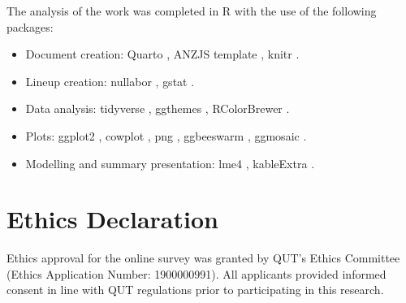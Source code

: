 \documentclass[
doublespace,
  times]{anzsauth}
\providecommand{\tightlist}{%
  \setlength{\itemsep}{0pt}\setlength{\parskip}{0pt}}
\begin{document}
The analysis of the work was completed in \textsf{R} \citep{RCore} with
the use of the following packages:

\begin{itemize}
\tightlist
\item
  Document creation: \textsf{Quarto} \citep{Allaire_Quarto_2025}, ANZJS
  template \citep{quarto-anzjs}, \textsf{knitr} \citep{knitr}.
\item
  Lineup creation: \textsf{nullabor} \citep{nullabor}, \textsf{gstat}
  \citep{gstat}.
\item
  Data analysis: \textsf{tidyverse} \citep{tidyverse}, \textsf{ggthemes}
  \citep{ggthemes}, \textsf{RColorBrewer} \citep{RColorBrewer}.
\item
  Plots: \textsf{ggplot2} \citep{ggplot2}, \textsf{cowplot}
  \citep{cowplot}, \textsf{png} \citep{png}, \textsf{ggbeeswarm}
  \citep{ggbeeswarm}, \textsf{ggmosaic} \citep{ggmosaic}.
\item
  Modelling and summary presentation: \textsf{lme4} \citep{lme4},
  \textsf{kableExtra} \citep{kableExtra}.
\end{itemize}

\section*{Ethics Declaration}\label{ethics-declaration}

Ethics approval for the online survey was granted by QUT's Ethics
Committee (Ethics Application Number: 1900000991). All applicants
provided informed consent in line with QUT regulations prior to
participating in this research.



\end{document}
